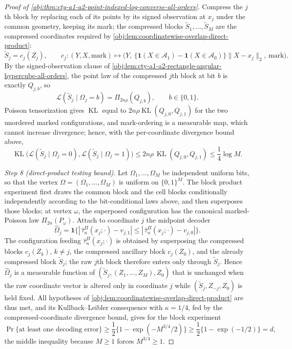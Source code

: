 \documentclass[11pt]{article}
\begin{document}
\begin{proof}[Proof of \cref{obj:thm:cty-a1-a2-point-indexed-log-converse-all-orders}]
Compress the \(j\)th block by replacing each of its points by its signed
observation at \(x_j\) under the common geometry, keeping its mark; the
compressed blocks \(\widetilde S_1,\ldots,\widetilde S_M\) are the compressed
coordinates required by \cref{obj:lem:coordinatewise-overlap-direct-product}:
\[
\widetilde S_j=c_j(Z_j),
\qquad
c_j:(Y,X,\text{mark})\longmapsto
\bigl(Y,\ \{\mathbf 1(X\in\mathcal A_1)-\mathbf 1(X\in\mathcal A_0)\}
\lVert X-x_j\rVert_2,\ \text{mark}\bigr).
\]
By the signed-observation clause of
\cref{obj:lem:cty-a1-a2-rectangle-angular-hypercube-all-orders}, the point law
of the compressed \(j\)th block at bit \(b\) is exactly \(Q_{j,b}\), so
\[
\mathcal L(\widetilde S_j\mid\Omega_j=b)=\Pi_{2n\rho}(Q_{j,b}),
\qquad b\in\{0,1\}.
\]
Poisson tensorization gives
\(\operatorname{KL}\) equal to \(2n\rho\operatorname{KL}(Q_{j,0},Q_{j,1})\) for
the two unordered marked configurations, and mark-ordering is a measurable map,
which cannot increase divergence; hence, with the per-coordinate divergence
bound above,
\[
\operatorname{KL}\bigl(\mathcal L(\widetilde S_j\mid\Omega_j=0),
\mathcal L(\widetilde S_j\mid\Omega_j=1)\bigr)
\leq
2n\rho\,\operatorname{KL}(Q_{j,0},Q_{j,1})
\leq
\frac14\log M .
\]

\emph{Step 8 (direct-product testing bound).}
Let \(\Omega_1,\ldots,\Omega_M\) be independent uniform bits, so that the
vertex \(\Omega=(\Omega_1,\ldots,\Omega_M)\) is uniform on \(\{0,1\}^M\).  The
block product experiment first draws the common block and the cell blocks
conditionally independently according to the bit-conditional laws above, and
then superposes those blocks; at vertex \(\omega\), the superposed configuration
has the canonical marked-Poisson law \(\Pi_{2n}(P_\omega)\).  Attach to
coordinate \(j\) the midpoint decoder
\[
\widehat\Omega_j
=\mathbf 1\bigl\{|\,\widehat\tau^{\Pi}_n(x_j;\cdot)-v_{j,1}|
\leq|\,\widehat\tau^{\Pi}_n(x_j;\cdot)-v_{j,0}|\bigr\}.
\]
The configuration feeding \(\widehat\tau^{\Pi}_n(x_j;\cdot)\) is obtained by
superposing the compressed blocks \(c_j(Z_k)\), \(k\neq j\), the compressed
ancillary block \(c_j(Z_0)\), and the already compressed block
\(\widetilde S_j\); the raw \(j\)th block therefore enters only through
\(\widetilde S_j\).  Hence \(\widehat\Omega_j\) is a measurable function of
\((\widetilde S_j,(Z_1,\ldots,Z_M),Z_0)\) that is unchanged when the raw
coordinate vector is altered only in coordinate \(j\) while
\((\widetilde S_j,Z_{-j},Z_0)\) is held fixed.
All hypotheses of \cref{obj:lem:coordinatewise-overlap-direct-product} are thus
met, and its Kullback--Leibler consequence with \(\kappa=1/4\), fed by the
compressed-coordinate divergence bound, gives for the block experiment
\[
\Pr\{\text{at least one decoding error}\}
\geq
\frac12\bigl\{1-\exp(-M^{3/4}/2)\bigr\}
\geq
\frac12\bigl\{1-\exp(-1/2)\bigr\}
=d,
\]
the middle inequality because \(M\geq1\) forces \(M^{3/4}\geq1\).


\end{proof}
\end{document}
